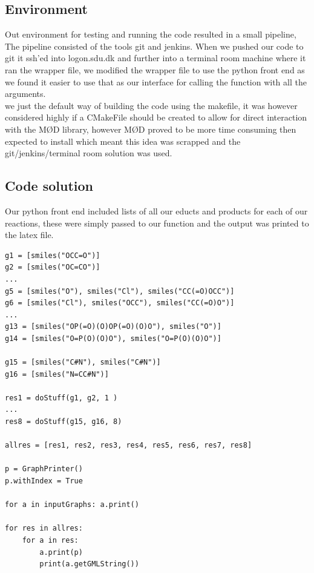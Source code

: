 \documentclass[a4paper,10pt,titlepage]{report}
\begin{document}
\subsection{Environment}
Out environment for testing and running the code resulted in a small pipeline, The pipeline consisted of the tools git and jenkins. When we pushed our code to git it ssh'ed into logon.sdu.dk and further into a terminal room machine where it ran the wrapper file, we modified the wrapper file to use the python front end as we found it easier to use that as our interface for calling the function with all the arguments.
\\
we just the default way of building the code using the makefile, it was however considered highly if a CMakeFile should be created to allow for direct interaction with the MØD library, however MØD proved to be more time consuming then expected to install which meant this idea was scrapped and the git/jenkins/terminal room solution was used.
\\


\subsection {Code solution}

Our python front end included lists of all our educts and products for each of our reactions, these were simply passed to our function and the output was printed to the latex file.
\begin{lstlisting}
g1 = [smiles("OCC=O")]
g2 = [smiles("OC=CO")]
...
g5 = [smiles("O"), smiles("Cl"), smiles("CC(=O)OCC")]
g6 = [smiles("Cl"), smiles("OCC"), smiles("CC(=O)O")]
...
g13 = [smiles("OP(=O)(O)OP(=O)(O)O"), smiles("O")]
g14 = [smiles("O=P(O)(O)O"), smiles("O=P(O)(O)O")]

g15 = [smiles("C#N"), smiles("C#N")]
g16 = [smiles("N=CC#N")]

res1 = doStuff(g1, g2, 1 )
...
res8 = doStuff(g15, g16, 8)

allres = [res1, res2, res3, res4, res5, res6, res7, res8]

p = GraphPrinter()
p.withIndex = True

for a in inputGraphs: a.print()

for res in allres:
    for a in res:
        a.print(p)
        print(a.getGMLString())
\end{lstlisting}
\end{document}
